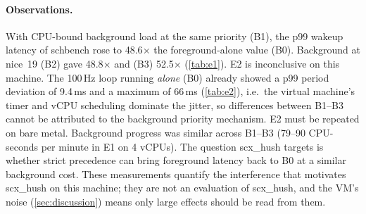 \paragraph{Observations.}
With CPU-bound background load at the same priority (B1), the p99 wakeup latency of schbench rose to 48.6$\times$ the foreground-alone value (B0). Background at nice~19 (B2) gave 48.8$\times$ and  (B3) 52.5$\times$ (\cref{tab:e1}).
E2 is inconclusive on this machine. The 100\,Hz loop running \emph{alone} (B0) already showed a p99 period deviation of 9.4\,ms and a maximum of 66\,ms (\cref{tab:e2}), i.e.\ the virtual machine's timer and vCPU scheduling dominate the jitter, so differences between B1--B3 cannot be attributed to the background priority mechanism. E2 must be repeated on bare metal.
Background progress was similar across B1--B3 (79--90 CPU-seconds per minute in E1 on 4 vCPUs). The question scx\_hush targets is whether strict precedence can bring foreground latency back to B0 at a similar background cost.
These measurements quantify the interference that motivates scx\_hush on this machine; they are not an evaluation of scx\_hush, and the VM's noise (\cref{sec:discussion}) means only large effects should be read from them.
